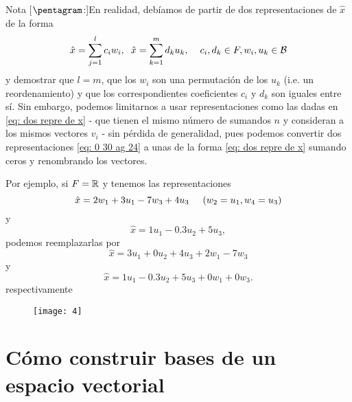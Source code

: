 Nota [$\pentagram$:]En realidad, debíamos de partir de dos
representaciones de $\hat{x}$ de la forma
\begin{equation}
	\label{eq: 0 30 ag 24}
\hat{x} = \sum_{j=1}^{l} c_{i} w_{i},
\hspace{0.2cm}
\hat{x} = \sum_{k=1}^{m} d_{k}u_{k},
\hspace{0.4cm} c_{i}, d_{k} \in F, 
w_{i}, u_{k} \in \mathcal{B} 
\end{equation}
y demostrar que $l = m$, que los $w_{i}$ son una permutación
de los $u_{k}$ (i.e. un reordenamiento) y que los correspondientes
coeficientes $c_{i}$ y $d_{k}$ son iguales entre sí. Sin embargo,
podemos limitarnos a usar representaciones como las dadas en 
\eqref{eq: dos repre de x}
- que tienen el mismo número de sumandos $n$ y consideran a los
mismos vectores $v_{i}$ - sin pérdida de generalidad, pues podemos convertir 
dos representaciones \eqref{eq: 0 30 ag 24} a 
unas de la forma \eqref{eq: dos repre de x}
sumando ceros y renombrando los vectores.

Por ejemplo, si $F = \mathbb{R}$ y tenemos las representaciones
\[
\hat{x} = 2 w_{1} + 3 u_{1} -7w_{3} + 4 u_{3}
\hspace{0.5cm} (w_{2} = u_{1}, w_{4} = u_{3})
\]
y
\[
\hat{x} = 1u_{1} - 0.3 u_{2} + 5 u_{3},
\]
podemos reemplazarlas por
\[
\hat{x} = 3 u_{1} + 0 u_{2} + 4u_{3} + 2 w_{1} - 7 w_{3}
\]
y
\[
\hat{x} = 1u_{1} - 0.3 u_{2} + 5 u_{3} + 0 w_{1} + 0 w_{3}. 
\]
respectivamente


\begin{figure}[H]
	\centering
	\texttt{[image: 4]} 
\end{figure}	

\section{Cómo construir bases de un espacio vectorial}

